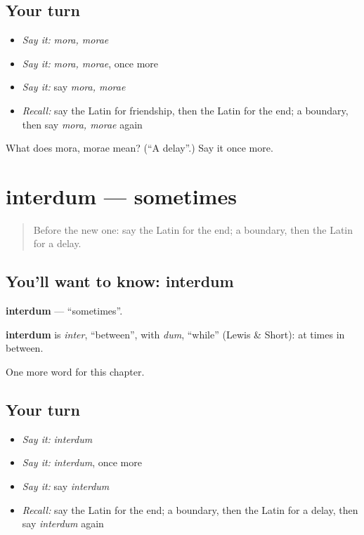 \subsection*{Your turn}
\begin{itemize}
\raggedright
  \item \emph{Say it:} \emph{mora, morae}
  \item \emph{Say it:} \emph{mora, morae}, once more
  \item \emph{Say it:} say \emph{mora, morae}
  \item \emph{Recall:} say the Latin for friendship, then the Latin for the end; a boundary, then say \emph{mora, morae} again
\end{itemize}

\begin{tcolorbox}[breakable,colback=teal!4,colframe=teal!35!black,title={Before you move on}]
What does mora, morae mean? (\textquotedblleft{}A delay\textquotedblright{}.) Say it once more.
\end{tcolorbox}
\section[interdum]{interdum — sometimes}

\label{lesson:LA-C237-interdum}



\begin{quote}
Before the new one: say the Latin for the end; a boundary, then the Latin for a delay.
\end{quote}

\subsection*{You'll want to know: interdum}
\textbf{interdum} — \textquotedblleft{}sometimes\textquotedblright{}.

\begin{cousinweb}
\textbf{interdum} is \emph{inter}, \textquotedblleft{}between\textquotedblright{}, with \emph{dum}, \textquotedblleft{}while\textquotedblright{} (Lewis \& Short): at times in between.
\end{cousinweb}

\begin{grammarlens}[title={What you've built}]
One more word for this chapter.
\end{grammarlens}

\subsection*{Your turn}
\begin{itemize}
\raggedright
  \item \emph{Say it:} \emph{interdum}
  \item \emph{Say it:} \emph{interdum}, once more
  \item \emph{Say it:} say \emph{interdum}
  \item \emph{Recall:} say the Latin for the end; a boundary, then the Latin for a delay, then say \emph{interdum} again
\end{itemize}


